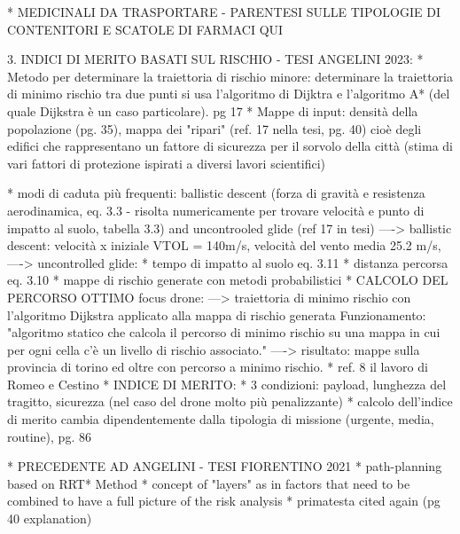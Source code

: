 * MEDICINALI DA TRASPORTARE - PARENTESI SULLE TIPOLOGIE DI CONTENITORI E SCATOLE DI FARMACI QUI




3. INDICI DI MERITO BASATI SUL RISCHIO - TESI ANGELINI 2023:
* Metodo per determinare la traiettoria di rischio minore: determinare la traiettoria di minimo rischio tra due punti si usa l’algoritmo di Dijktra e l’algoritmo A* (del quale Dijkstra è un caso particolare). pg 17
* Mappe di input: densità della popolazione (pg. 35), mappa dei "ripari" (ref. 17 nella tesi, pg. 40) cioè degli edifici che rappresentano un fattore di sicurezza per il sorvolo della città (stima di vari fattori di protezione ispirati a diversi lavori scientifici)

* modi di caduta più frequenti: ballistic descent (forza di gravità e resistenza aerodinamica, eq. 3.3 - risolta numericamente per trovare velocità e punto di impatto al suolo, tabella 3.3) and uncontrooled glide (ref 17 in tesi)
----> ballistic descent: velocità x iniziale VTOL = 140m/s, velocità del vento media 25.2 m/s, 
----> uncontrolled glide: 
    * tempo di impatto al suolo eq. 3.11
    * distanza percorsa eq. 3.10
* mappe di rischio generate con metodi probabilistici
* CALCOLO DEL PERCORSO OTTIMO focus drone:
    ---> traiettoria di minimo rischio con l'algoritmo Dijkstra applicato alla mappa di rischio generata
    Funzionamento: "algoritmo statico che calcola il percorso di minimo rischio su una mappa in cui per ogni cella c’è un livello di rischio associato."
     ----> risultato: mappe sulla provincia di torino ed oltre con percorso a minimo rischio.
* ref. 8 il lavoro di Romeo e Cestino
* INDICE DI MERITO:
    * 3 condizioni: payload, lunghezza del tragitto, sicurezza (nel caso del drone molto più penalizzante)
    * calcolo dell'indice di merito cambia dipendentemente dalla tipologia di missione (urgente, media, routine), pg. 86



* PRECEDENTE AD ANGELINI - TESI FIORENTINO 2021
* path-planning based on RRT* Method
* concept of "layers" as in factors that need to be combined to have a full picture of the risk analysis
* primatesta cited again (pg 40 explanation)





